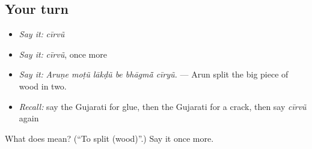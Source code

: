\subsection*{Your turn}
\begin{itemize}
\raggedright
  \item \emph{Say it:} \emph{cīrvũ}
  \item \emph{Say it:} \emph{cīrvũ}, once more
  \item \emph{Say it:} \emph{Aruṇe moṭũ lākḍũ be bhāgmā̃ cīryũ.} — Arun split the big piece of wood in two.
  \item \emph{Recall:} say the Gujarati for glue, then the Gujarati for a crack, then say \emph{cīrvũ} again
\end{itemize}

\begin{tcolorbox}[breakable,colback=teal!4,colframe=teal!35!black,title={Before you move on}]
What does  mean? (\textquotedblleft{}To split (wood)\textquotedblright{}.) Say it once more.
\end{tcolorbox}
